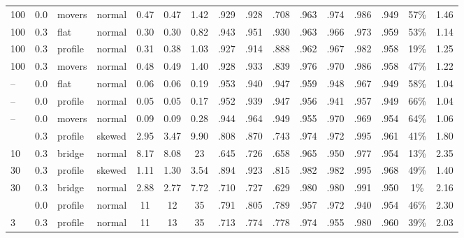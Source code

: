 \begin{tabular}{@{}l l l l ccc ccc ccc c c c@{}}
100 & 0.0 & movers & normal & 0.47 & 0.47 & 1.42 & .929 & .928 & .708 & .963 & .974 & .986 & .949 & 57\% & 1.46 \\
100 & 0.3 & flat & normal & 0.30 & 0.30 & 0.82 & .943 & .951 & .930 & .963 & .966 & .973 & .959 & 53\% & 1.14 \\
100 & 0.3 & profile & normal & 0.31 & 0.38 & 1.03 & .927 & .914 & .888 & .962 & .967 & .982 & .958 & 19\% & 1.25 \\
100 & 0.3 & movers & normal & 0.48 & 0.49 & 1.40 & .928 & .933 & .839 & .976 & .970 & .986 & .958 & 47\% & 1.22 \\
\addlinespace
-- & 0.0 & flat & normal & 0.06 & 0.06 & 0.19 & .953 & .940 & .947 & .959 & .948 & .967 & .949 & 58\% & 1.04 \\
-- & 0.0 & profile & normal & 0.05 & 0.05 & 0.17 & .952 & .939 & .947 & .956 & .941 & .957 & .949 & 66\% & 1.04 \\
-- & 0.0 & movers & normal & 0.09 & 0.09 & 0.28 & .944 & .964 & .949 & .955 & .970 & .969 & .954 & 64\% & 1.06 \\
\addlinespace
10 & 0.3 & profile & skewed & 2.95 & 3.47 & 9.90 & .808 & .870 & .743 & .974 & .972 & .995 & .961 & 41\% & 1.80 \\
10 & 0.3 & bridge & normal & 8.17 & 8.08 & 23 & .645 & .726 & .658 & .965 & .950 & .977 & .954 & 13\% & 2.35 \\
30 & 0.3 & profile & skewed & 1.11 & 1.30 & 3.54 & .894 & .923 & .815 & .982 & .982 & .995 & .968 & 49\% & 1.40 \\
30 & 0.3 & bridge & normal & 2.88 & 2.77 & 7.72 & .710 & .727 & .629 & .980 & .980 & .991 & .950 & 1\% & 2.16 \\
\addlinespace
3 & 0.0 & profile & normal & 11 & 12 & 35 & .791 & .805 & .789 & .957 & .972 & .940 & .954 & 46\% & 2.30 \\
3 & 0.3 & profile & normal & 11 & 13 & 35 & .713 & .774 & .778 & .974 & .955 & .980 & .960 & 39\% & 2.03 \\
\bottomrule
\end{tabular}
